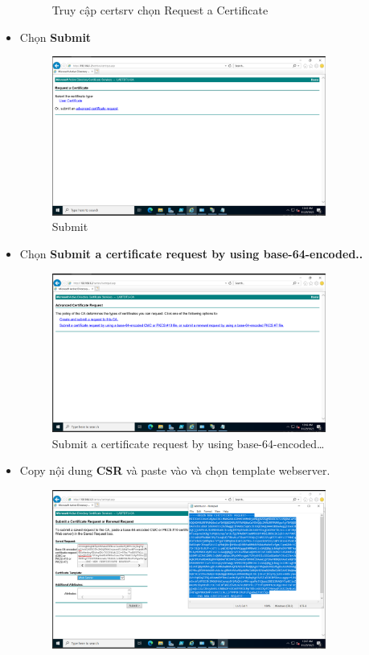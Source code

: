 \documentclass[13pt]{report}
\begin{document}
\begin{itemize}
\begin{figure}[htp]
			\caption{Truy cập certsrv chọn Request a Certificate}
		\end{figure}
		\item	Chọn \textbf{Submit}
		\begin{figure}[htp]
			\centering
			\includegraphics[width=0.85\textwidth]{image/PowerShell/ADCS/7.png}
			\caption{Submit}
		\end{figure}
		\newpage
		\item Chọn \textbf{Submit a certificate request by using base-64-encoded..} 
		\begin{figure}[htp]
			\centering
			\includegraphics[width=0.85\textwidth]{image/PowerShell/ADCS/8.png}
			\caption{Submit a certificate request by using base-64-encoded…}
		\end{figure}
		\item Copy nội dung \textbf{CSR} và paste vào và chọn template webserver.
		\begin{figure}[htp]
			\centering
			\includegraphics[width=0.85\textwidth]{image/PowerShell/ADCS/9.png}

\end{figure}
\end{itemize}
\end{document}
